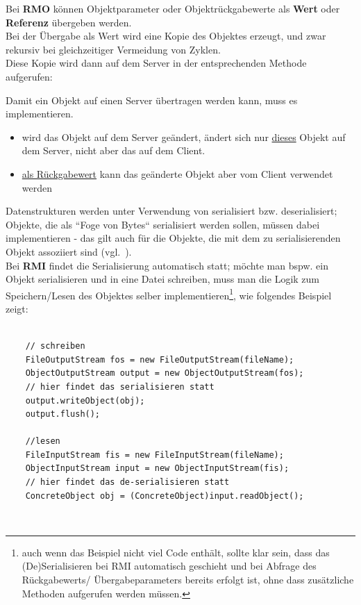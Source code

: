 Bei \textbf{RMO} können Objektparameter oder Objektrückgabewerte als \textbf{Wert} oder \textbf{Referenz} übergeben werden.\\

\noindent
Bei der Übergabe als Wert wird eine Kopie des Objektes erzeugt, und zwar rekursiv bei gleichzeitiger Vermeidung von Zyklen.\\

\noindent
Diese Kopie wird dann auf dem Server in der entsprechenden Methode aufgerufen:

\begin{tcolorbox}
    Damit ein Objekt auf einen Server übertragen werden kann, muss es  implementieren.
\end{tcolorbox}

\begin{itemize}
    \item wird das Objekt auf dem Server geändert, ändert sich nur \ul{dieses} Objekt auf dem Server, nicht aber das auf dem Client.
    \item \ul{als Rückgabewert} kann das geänderte Objekt aber vom Client verwendet werden
\end{itemize}

Datenstrukturen werden unter Verwendung von  serialisiert {bzw.} deserialisiert; Objekte, die als ``Foge von Bytes`` serialisiert werden sollen, müssen dabei  implementieren  - das gilt auch für die Objekte, die mit dem zu serialisierenden Objekt assoziiert sind (vgl.~\cite[332]{Oec22}).\\

\noindent
Bei \textbf{RMI} findet die Serialisierung automatisch statt; möchte man {bspw.} ein Objekt serialisieren und in eine Datei schreiben, muss man die Logik zum Speichern/Lesen des Objektes selber implementieren\footnote{
auch wenn das Beispiel nicht viel Code enthält, sollte klar sein, dass das (De)Serialisieren bei RMI automatisch geschieht und bei Abfrage des Rückgabewerts/ Übergabeparameters bereits erfolgt ist, ohne dass zusätzliche Methoden aufgerufen werden müssen.
}, wie folgendes Beispiel zeigt:\\

\begin{verbatim}

    // schreiben
    FileOutputStream fos = new FileOutputStream(fileName);
    ObjectOutputStream output = new ObjectOutputStream(fos);
    // hier findet das serialisieren statt
    output.writeObject(obj);
    output.flush();

    //lesen
    FileInputStream fis = new FileInputStream(fileName);
    ObjectInputStream input = new ObjectInputStream(fis);
    // hier findet das de-serialisieren statt
    ConcreteObject obj = (ConcreteObject)input.readObject();
\end{verbatim}\\

